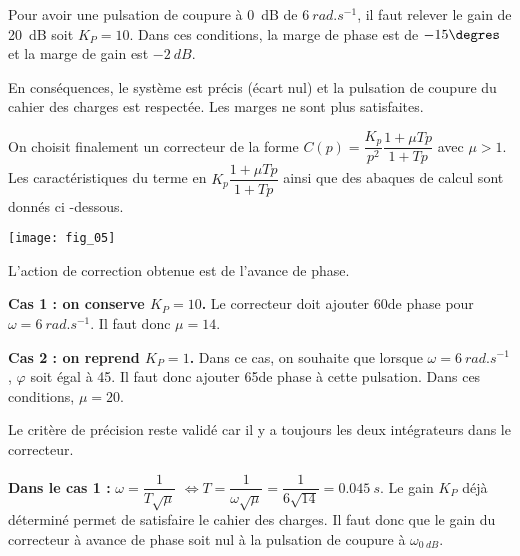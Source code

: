 \begin{multicols}{2}
\begin{multicols}{2}
\begin{corrige}
Pour avoir une pulsation de coupure à \SI{0}{dB} de $\SI{6}{rad.s^{-1}}$, il faut relever le gain de \SI{20}{dB} soit $K_P=10$. Dans ces conditions, la marge de phase est de $-15\degres$ et la marge de gain est $\SI{-2}{dB}$. 

En conséquences, le système est précis (écart nul) et la pulsation de coupure du cahier des charges est respectée. Les marges ne sont plus satisfaites.  
\end{corrige}
\else
\fi

\ifprof
\else

On choisit finalement un correcteur de la forme $C(p)= \dfrac{K_p}{p^2}\dfrac{1+\mu Tp}{1+Tp}$ avec $\mu > 1$.
Les caractéristiques du terme en $K_p\dfrac{1+\mu Tp}{1+Tp}$  ainsi que des abaques de calcul sont donnés ci -dessous. 

\begin{center}
\texttt{[image: fig\_05]}
\end{center}
\fi

\ifprof
\begin{corrige}
L'action de correction obtenue est de l'avance de phase. 
\end{corrige}
\else
\fi


\ifprof
\begin{corrige}
\textbf{Cas 1 : on conserve $K_P=10$.}
 Le correcteur doit ajouter 60\degres de phase pour $\omega=\SI{6}{rad.s^{-1}}$. Il faut donc $\mu=14$.
 
 \textbf{Cas 2 : on reprend $K_P=1$.}
 Dans ce cas, on souhaite que lorsque $\omega=\SI{6}{rad.s^{-1}}$, $\varphi$ soit égal à 45\degres. Il faut donc ajouter 65\degres de phase à cette pulsation. Dans ces conditions, $\mu=20$.
 
Le critère de précision reste validé car il y a toujours les deux intégrateurs dans le correcteur. 
\end{corrige}
\else
\fi


\ifprof
\begin{corrige}
\textbf{Dans le cas 1 :}
$\omega=\dfrac{1}{T\sqrt{\mu}}$ $ \Leftrightarrow T=\dfrac{1}{\omega\sqrt{\mu}}=\dfrac{1}{6\sqrt{14}}=\SI{0,045}{s}$.
Le gain $K_P$ déjà déterminé permet de satisfaire le cahier des charges. Il faut donc que le gain du correcteur à avance de phase soit nul à la pulsation de coupure à $\omega_{\SI{0}{dB}}$.


\end{corrige}
\end{multicols}
\end{multicols}
